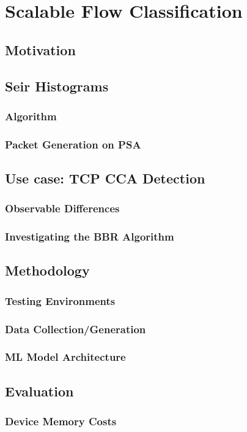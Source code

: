 \documentclass[twoside,hidelinks]{glasgowthesis}
\begin{document}
\chapter{Scalable Flow Classification}
\section{Motivation}
\section{Sei\dh{}r Histograms}
\subsection{Algorithm}
\subsection{Packet Generation on PSA}
\section{Use case: TCP CCA Detection}
\subsection{Observable Differences}
\subsection{Investigating the BBR Algorithm}
\section{Methodology}
\subsection{Testing Environments}
\subsection{Data Collection/Generation}
\subsection{ML Model Architecture}
\section{Evaluation}
\subsection{Device Memory Costs}
\end{document}
